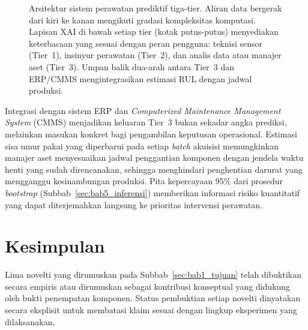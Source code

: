 \begin{figure}[ht]
{%
}
\caption{Arsitektur sistem perawatan prediktif tiga-tier. Aliran data bergerak
         dari kiri ke kanan mengikuti gradasi kompleksitas komputasi. Lapisan XAI
         di bawah setiap tier (kotak putus-putus) menyediakan keterbacaan yang
         sesuai dengan peran pengguna: teknisi sensor (Tier~1), insinyur perawatan
         (Tier~2), dan analis data atau manajer aset (Tier~3). Umpan balik
         dua-arah antara Tier~3 dan ERP/CMMS mengintegrasikan estimasi RUL dengan
         jadwal produksi.}
\label{fig:bab6_pdm_multitier}
\end{figure}

Integrasi dengan sistem ERP dan \emph{Computerized Maintenance Management
System} (CMMS) menjadikan keluaran Tier~3 bukan sekadar angka prediksi,
melainkan masukan konkret bagi pengambilan keputusan operasional. Estimasi sisa
umur pakai yang diperbarui pada setiap \emph{batch} akuisisi memungkinkan
manajer aset menyesuaikan jadwal penggantian komponen dengan jendela waktu henti
yang sudah direncanakan, sehingga menghindari penghentian darurat yang
mengganggu kesinambungan produksi. Pita kepercayaan 95\% dari prosedur
\emph{bootstrap} (Subbab~\ref{sec:bab5_inferensi}) memberikan informasi risiko
kuantitatif yang dapat diterjemahkan langsung ke prioritas intervensi perawatan.

\section{Kesimpulan}
\label{sec:bab6_kesimpulan}

Lima novelti yang dirumuskan pada Subbab~\ref{sec:bab1_tujuan} telah
dibuktikan secara empiris atau dirumuskan sebagai kontribusi konseptual yang
didukung oleh bukti penempatan komponen. Status pembuktian setiap novelti
dinyatakan secara eksplisit untuk membatasi klaim sesuai dengan lingkup
eksperimen yang dilaksanakan.

